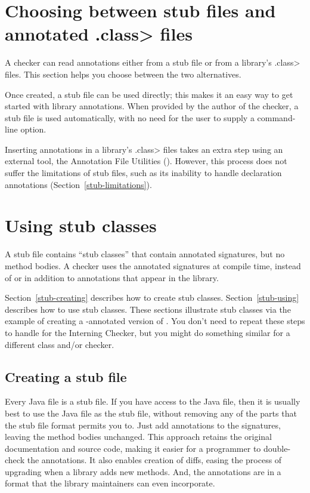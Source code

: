 \section{Choosing between stub files and annotated \<.class> files}

A checker can read annotations either from a stub file or from a library's
\<.class> files.  This section helps you choose between the two alternatives.

Once created, a stub file can be used directly; this makes it an easy way
to get started with library annotations.
When provided by the author of the checker, a stub file is used
automatically, with no need for the user to supply a command-line option.

Inserting annotations in a library's \<.class> files takes an extra step
using an external tool, the Annotation File Utilities
().
However, this process does not suffer the limitations of stub files, such
as its inability to handle declaration annotations
(Section~\ref{stub-limitations}).


\section{Using stub classes\label{stub}\label{stub-creating-and-using}}

A stub file contains ``stub classes'' that contain annotated signatures,
but no method bodies.  A
checker uses the annotated signatures at compile time, instead of or in
addition to annotations that appear in the library.

Section~\ref{stub-creating} describes how to create stub classes.
Section~\ref{stub-using} describes how to use stub classes.
These sections illustrate stub classes via the example of creating a -annotated
version of .  You don't need to repeat these steps
to handle  for the Interning Checker,
but you might do something similar for a different class and/or checker.


\subsection{Creating a stub file\label{stub-creating}}

Every Java file is a stub file.  If you have access to the Java file, then
it is usually best to use the Java file as the stub file, without removing
any of the parts that the stub file format permits you to.  Just add
annotations to the signatures, leaving the method bodies unchanged.
This approach retains the original
documentation and source code, making it easier for a programmer to
double-check the annotations.  It also enables creation of diffs, easing
the process of upgrading when a library adds new methods.  And, the
annotations are in a format that the library maintainers can even
incorporate.

